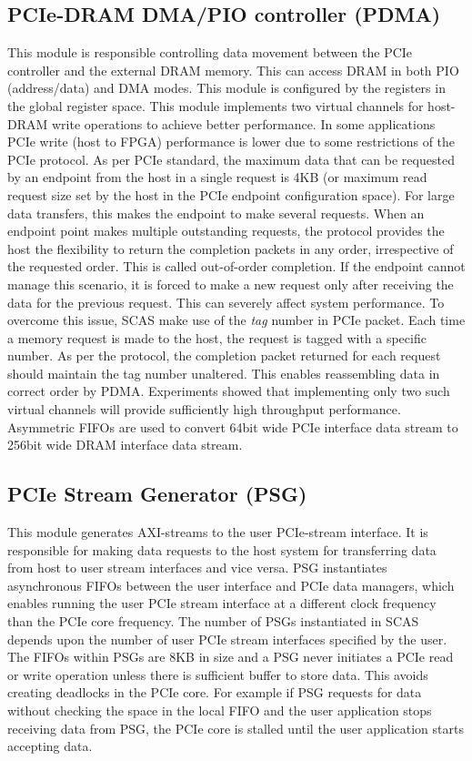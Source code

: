 \subsection{PCIe-DRAM DMA/PIO controller (PDMA)}
This module is responsible controlling data movement between the PCIe controller and the external DRAM memory.
This can access DRAM in both PIO (address/data) and DMA modes.
This module is configured by the registers in the global register space.
This module implements two virtual channels for host-DRAM write operations to achieve better performance.
In some applications PCIe write (host to FPGA) performance is lower due to some restrictions of the PCIe protocol.
As per PCIe standard, the maximum data that can be requested by an endpoint from the host in a single request is 4KB (or maximum read request size set by the host in the PCIe endpoint configuration space).
For large data transfers, this makes the endpoint to make several requests.
When an endpoint point makes multiple outstanding requests, the protocol provides the host the flexibility to return the completion packets in any order, irrespective of the requested order.
This is called out-of-order completion.
If the endpoint cannot manage this scenario, it is forced to make a new request only after receiving the data for the previous request.
This can severely affect system performance.
To overcome this issue, SCAS make use of the \emph{tag} number in PCIe packet.
Each time a memory request is made to the host, the request is tagged with a specific number.
As per the protocol, the completion packet returned for each request should maintain the tag number unaltered.
This enables reassembling data in correct order by PDMA.
Experiments showed that implementing only two such virtual channels will provide sufficiently high throughput performance.
Asymmetric FIFOs are used to convert 64bit wide PCIe interface data stream to 256bit wide DRAM interface data stream.

\subsection{PCIe Stream Generator (PSG)}
This module generates AXI-streams to the user PCIe-stream interface.
It is responsible for making data requests to the host system for transferring data from host to user stream interfaces and vice versa.
PSG instantiates asynchronous FIFOs between the user interface and PCIe data managers, which enables running the user PCIe stream interface at a different clock frequency than the PCIe core frequency.
The number of PSGs instantiated in SCAS depends upon the number of user PCIe stream interfaces specified by the user.
The FIFOs within PSGs are 8KB in size and a PSG never initiates a PCIe read or write operation unless there is sufficient buffer to store data.
This avoids creating deadlocks in the PCIe core.
For example if PSG requests for data without checking the space in the local FIFO and the user application stops receiving data from PSG, the PCIe core is stalled until the user application starts accepting data.


